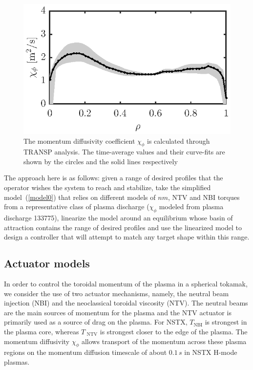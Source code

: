 \documentclass{iopart}
\begin{document}
\begin{figure}
\centering
\includegraphics{imene_figs/fig2} %
\caption{The momentum diffusivity coefficient $ \chi_{\phi}$ is calculated through TRANSP analysis. The time-average values and their curve-fits are shown by the circles  and the solid lines respectively}
\label{fig:chiphi}
\end{figure}


The approach here is as follows: given a range of desired profiles that
the operator wishes the system to reach and stabilize,
take the simplified model~(\ref{model0}) that relies on different models of $ n  m$,
NTV and NBI torques from a representative class of plasma discharge ($\chi_\phi$ modeled from plasma discharge 133775),
linearize the model around an equilibrium whose basin of attraction contains the range of desired profiles
and use the linearized model to design a controller that will attempt to match any target shape within this range.

\subsection{Actuator models}

In order to control the toroidal momentum of the plasma in a spherical tokamak, we consider the use of two actuator mechanisms, namely, the neutral beam injection (NBI) and the neoclassical toroidal viscosity (NTV). The neutral beams are the main sources of momentum for the plasma and the NTV actuator is primarily used as a source of drag on the plasma. For NSTX, $T_\text{NBI}$ is strongest  in the plasma core, whereas $T_\text{ NTV}$ is strongest closer to the edge of the plasma. The momentum diffusivity $\chi_\phi$ allows transport of the momentum across these plasma regions on the momentum diffusion timescale of about $0.1\,s$ in NSTX H-mode plasmas.
\end{document}
